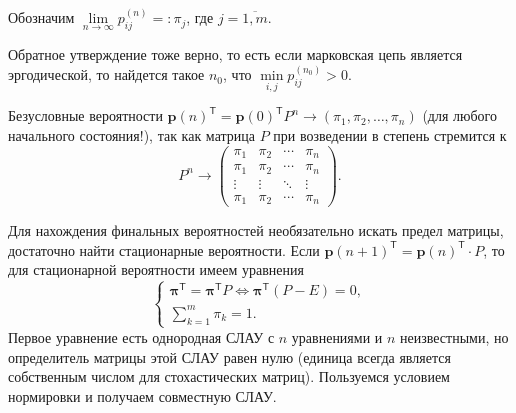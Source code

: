 Обозначим $\lim\limits_{n\to\infty} p_{ij}^{(n)} =: \pi_j$, где $j = \overline{1, m}$. 

\begin{remark*}
  Обратное утверждение тоже верно, то есть если марковская цепь является эргодической, то найдется
  такое $n_0$, что $\min\limits_{i, j} p_{ij}^{(n_0)} > 0$.
\end{remark*}

\setcounter{corollary}{0}
\begin{corollary}
  Безусловные вероятности $\mathbf{p} (n)^{\mathsf T} = \mathbf{p}(0)^{\mathsf T} P^n \to
  \left(\pi_1 , \pi_2 , \dots , \pi_n \right)$ (для любого начального
  состояния!), так как матрица $P$ при возведении в степень стремится к
  \[
    P^n \to \begin{pmatrix}
      \pi_1 & \pi_2 & \cdots & \pi_n \\
      \pi_1 & \pi_2 & \cdots & \pi_n \\
      \vdots & \vdots & \ddots & \vdots \\
      \pi_1 & \pi_2 & \cdots & \pi_n
    \end{pmatrix}.
  \]
\end{corollary}

\begin{corollary}
  Для нахождения финальных вероятностей необязательно искать предел матрицы,
  достаточно найти стационарные вероятности. Если $\mathbf{p}(n+1)^{\mathsf T}
  = \mathbf{p}(n)^{\mathsf T} \cdot P$,
  то для стационарной вероятности имеем уравнения
  \[
    \begin{cases}
      \bm{\pi}^{\mathsf T} = \bm{\pi}^{\mathsf T} P \Leftrightarrow
      \bm\pi^{\mathsf T} (P - E) = 0,\\
      \sum\limits_{k=1}^m \pi_k = 1.
    \end{cases}
  \]
  Первое уравнение есть однородная СЛАУ с $n$ уравнениями и $n$ неизвестными, но определитель
  матрицы этой СЛАУ равен нулю (единица всегда является собственным числом для стохастических матриц). 
  Пользуемся условием нормировки и получаем совместную СЛАУ.

\end{corollary}

